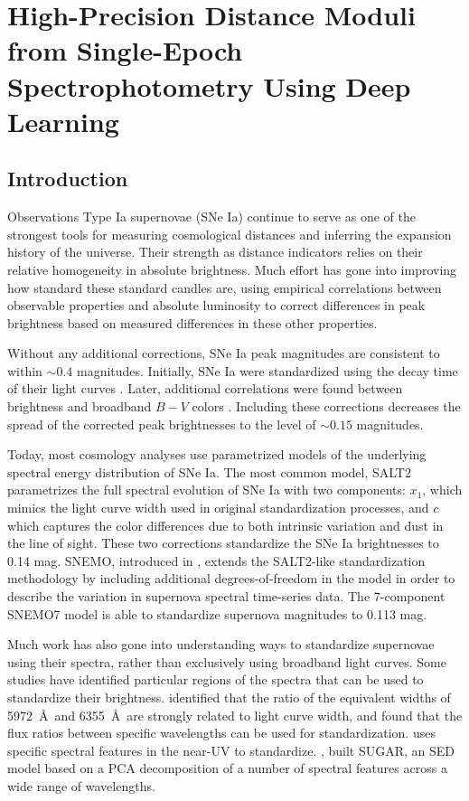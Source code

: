 \chapter{High-Precision Distance Moduli from Single-Epoch Spectrophotometry Using Deep Learning}
\label{chap:nn_twins}

\section{Introduction}
\label{sec:nn_twins_intro}
Observations Type Ia supernovae (SNe Ia) continue to serve as  one of the strongest tools for measuring cosmological distances and inferring the expansion history of the universe. Their strength as distance indicators relies on their relative homogeneity in absolute brightness. Much effort has gone into improving how standard these standard candles are, using empirical correlations between observable properties and absolute luminosity to correct differences in peak brightness based on measured differences in these other properties.

Without any additional corrections, SNe Ia peak magnitudes are consistent to within $\sim0.4$ magnitudes. Initially, SNe Ia were standardized using the decay time of their light curves \citep{phillips_absolute_1993}. Later, additional correlations were found between brightness and broadband $B-V$ colors \citep{riess_precise_1996, tripp_two-parameter_1998}. Including these corrections decreases the spread of the corrected peak brightnesses to the level of $\sim 0.15$ magnitudes.

Today, most cosmology analyses use parametrized models of the underlying spectral energy distribution of SNe Ia. The most common model, SALT2 \citep{guy_salt2_2007, betoule_improved_2014} parametrizes the full spectral evolution of SNe Ia with two components: $x_1$, which mimics the light curve width used in original standardization processes, and $c$ which captures the color differences due to both intrinsic variation and dust in the line of sight. These two corrections standardize the SNe Ia brightnesses to 0.14 mag. SNEMO, introduced in \cite{saunders_snemo_2018}, extends the SALT2-like standardization methodology by including additional degrees-of-freedom in the model in order to describe the variation in supernova spectral time-series data. The 7-component SNEMO7 model is able to standardize supernova magnitudes to 0.113 mag.

Much work has also gone into understanding ways to standardize supernovae using their spectra, rather than exclusively using broadband light curves. Some studies have identified particular regions of the spectra that can be used to standardize their brightness. \citet{nugent_evidence_1995} identified that the ratio of the equivalent widths of  5972~\AA\ and  6355~\AA\ are strongly related to light curve width, and \citet{bailey_using_2009} found that the flux ratios between specific wavelengths can be used for standardization. \citet{nordin_understanding_2018} uses specific spectral features in the near-UV to standardize. \cite{leget_sugar_2020}, built SUGAR, an SED model based on a PCA decomposition of a number of spectral features across a wide range of wavelengths.

